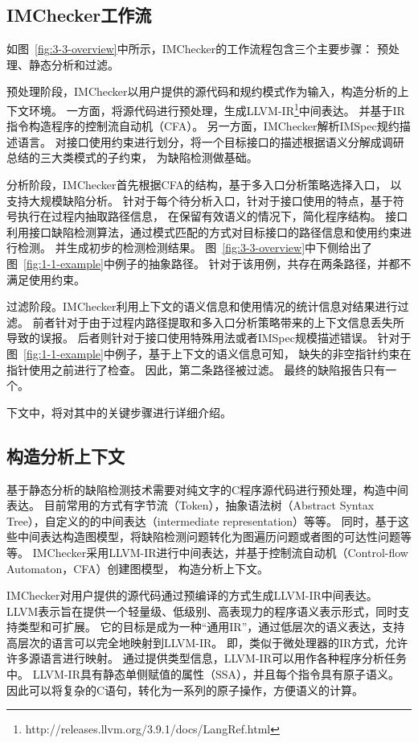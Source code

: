 \subsection{IMChecker工作流}

如图~\ref{fig:3-3-overview}中所示，IMChecker的工作流程包含三个主要步骤：
预处理、静态分析和过滤。

预处理阶段，IMChecker以用户提供的源代码和规约模式作为输入，构造分析的上下文环境。
一方面，将源代码进行预处理，生成LLVM-IR\footnote{http://releases.llvm.org/3.9.1/docs/LangRef.html}中间表达。
并基于IR指令构造程序的控制流自动机（CFA）。
另一方面，IMChecker解析IMSpec规约描述语言。
对接口使用约束进行划分，将一个目标接口的描述根据语义分解成调研总结的三大类模式的子约束，
为缺陷检测做基础。

分析阶段，IMChecker首先根据CFA的结构，基于多入口分析策略选择入口，
以支持大规模缺陷分析。
针对于每个待分析入口，针对于接口使用的特点，基于符号执行在过程内抽取路径信息，
在保留有效语义的情况下，简化程序结构。
接口利用接口缺陷检测算法，通过模式匹配的方式对目标接口的路径信息和使用约束进行检测。
并生成初步的检测检测结果。
图~\ref{fig:3-3-overview}中下侧给出了图~\ref{fig:1-1-example}中例子的抽象路径。
针对于该用例，共存在两条路径，并都不满足使用约束。

过滤阶段。IMChecker利用上下文的语义信息和使用情况的统计信息对结果进行过滤。
前者针对于由于过程内路径提取和多入口分析策略带来的上下文信息丢失所导致的误报。
后者则针对于接口使用特殊用法或者IMSpec规模描述错误。
针对于图~\ref{fig:1-1-example}中例子，基于上下文的语义信息可知，
缺失的非空指针约束在指针使用之前进行了检查。
因此，第二条路径被过滤。
最终的缺陷报告只有一个。

下文中，将对其中的关键步骤进行详细介绍。

\subsection{构造分析上下文}
基于静态分析的缺陷检测技术需要对纯文字的C程序源代码进行预处理，构造中间表达。
目前常用的方式有字节流（Token），抽象语法树（Abstract Syntax Tree），自定义的的中间表达（intermediate representation）等等。
同时，基于这些中间表达构造图模型，将缺陷检测问题转化为图遍历问题或者图的可达性问题等等。
IMChecker采用LLVM-IR进行中间表达，并基于控制流自动机（Control-flow Automaton，CFA）创建图模型，
构造分析上下文。

IMChecker对用户提供的源代码通过预编译的方式生成LLVM-IR中间表达。
LLVM表示旨在提供一个轻量级、低级别、高表现力的程序语义表示形式，同时支持类型和可扩展。
它的目标是成为一种“通用IR”，通过低层次的语义表达，支持高层次的语言可以完全地映射到LLVM-IR。
即，类似于微处理器的IR方式，允许许多源语言进行映射。
通过提供类型信息，LLVM-IR可以用作各种程序分析任务中。
LLVM-IR具有静态单侧赋值的属性（SSA），并且每个指令具有原子语义。
因此可以将复杂的C语句，转化为一系列的原子操作，方便语义的计算。

